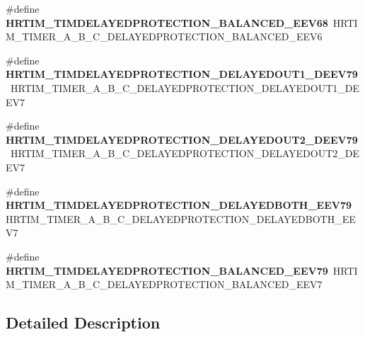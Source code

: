 \begin{DoxyCompactItemize}
\item 
\#define {\bfseries H\+R\+T\+I\+M\+\_\+\+T\+I\+M\+D\+E\+L\+A\+Y\+E\+D\+P\+R\+O\+T\+E\+C\+T\+I\+O\+N\+\_\+\+B\+A\+L\+A\+N\+C\+E\+D\+\_\+\+E\+E\+V68}~H\+R\+T\+I\+M\+\_\+\+T\+I\+M\+E\+R\+\_\+\+A\+\_\+\+B\+\_\+\+C\+\_\+\+D\+E\+L\+A\+Y\+E\+D\+P\+R\+O\+T\+E\+C\+T\+I\+O\+N\+\_\+\+B\+A\+L\+A\+N\+C\+E\+D\+\_\+\+E\+E\+V6\hypertarget{group___h_a_l___h_r_t_i_m___aliased___macros_gacc9d18290b90bd3ba98bc6aade450b32}{}\label{group___h_a_l___h_r_t_i_m___aliased___macros_gacc9d18290b90bd3ba98bc6aade450b32}

\item 
\#define {\bfseries H\+R\+T\+I\+M\+\_\+\+T\+I\+M\+D\+E\+L\+A\+Y\+E\+D\+P\+R\+O\+T\+E\+C\+T\+I\+O\+N\+\_\+\+D\+E\+L\+A\+Y\+E\+D\+O\+U\+T1\+\_\+\+D\+E\+E\+V79}~H\+R\+T\+I\+M\+\_\+\+T\+I\+M\+E\+R\+\_\+\+A\+\_\+\+B\+\_\+\+C\+\_\+\+D\+E\+L\+A\+Y\+E\+D\+P\+R\+O\+T\+E\+C\+T\+I\+O\+N\+\_\+\+D\+E\+L\+A\+Y\+E\+D\+O\+U\+T1\+\_\+\+D\+E\+E\+V7\hypertarget{group___h_a_l___h_r_t_i_m___aliased___macros_gaf2fa730ef2ff94596dc103780c6ea28a}{}\label{group___h_a_l___h_r_t_i_m___aliased___macros_gaf2fa730ef2ff94596dc103780c6ea28a}

\item 
\#define {\bfseries H\+R\+T\+I\+M\+\_\+\+T\+I\+M\+D\+E\+L\+A\+Y\+E\+D\+P\+R\+O\+T\+E\+C\+T\+I\+O\+N\+\_\+\+D\+E\+L\+A\+Y\+E\+D\+O\+U\+T2\+\_\+\+D\+E\+E\+V79}~H\+R\+T\+I\+M\+\_\+\+T\+I\+M\+E\+R\+\_\+\+A\+\_\+\+B\+\_\+\+C\+\_\+\+D\+E\+L\+A\+Y\+E\+D\+P\+R\+O\+T\+E\+C\+T\+I\+O\+N\+\_\+\+D\+E\+L\+A\+Y\+E\+D\+O\+U\+T2\+\_\+\+D\+E\+E\+V7\hypertarget{group___h_a_l___h_r_t_i_m___aliased___macros_ga8facb4c8782a5539246df190451ebf91}{}\label{group___h_a_l___h_r_t_i_m___aliased___macros_ga8facb4c8782a5539246df190451ebf91}

\item 
\#define {\bfseries H\+R\+T\+I\+M\+\_\+\+T\+I\+M\+D\+E\+L\+A\+Y\+E\+D\+P\+R\+O\+T\+E\+C\+T\+I\+O\+N\+\_\+\+D\+E\+L\+A\+Y\+E\+D\+B\+O\+T\+H\+\_\+\+E\+E\+V79}~H\+R\+T\+I\+M\+\_\+\+T\+I\+M\+E\+R\+\_\+\+A\+\_\+\+B\+\_\+\+C\+\_\+\+D\+E\+L\+A\+Y\+E\+D\+P\+R\+O\+T\+E\+C\+T\+I\+O\+N\+\_\+\+D\+E\+L\+A\+Y\+E\+D\+B\+O\+T\+H\+\_\+\+E\+E\+V7\hypertarget{group___h_a_l___h_r_t_i_m___aliased___macros_ga81abc6daa4a2456ca1428c3fe1796e52}{}\label{group___h_a_l___h_r_t_i_m___aliased___macros_ga81abc6daa4a2456ca1428c3fe1796e52}

\item 
\#define {\bfseries H\+R\+T\+I\+M\+\_\+\+T\+I\+M\+D\+E\+L\+A\+Y\+E\+D\+P\+R\+O\+T\+E\+C\+T\+I\+O\+N\+\_\+\+B\+A\+L\+A\+N\+C\+E\+D\+\_\+\+E\+E\+V79}~H\+R\+T\+I\+M\+\_\+\+T\+I\+M\+E\+R\+\_\+\+A\+\_\+\+B\+\_\+\+C\+\_\+\+D\+E\+L\+A\+Y\+E\+D\+P\+R\+O\+T\+E\+C\+T\+I\+O\+N\+\_\+\+B\+A\+L\+A\+N\+C\+E\+D\+\_\+\+E\+E\+V7\hypertarget{group___h_a_l___h_r_t_i_m___aliased___macros_gad90cefe9f64cf5f3efe38213706b4f94}{}\label{group___h_a_l___h_r_t_i_m___aliased___macros_gad90cefe9f64cf5f3efe38213706b4f94}

\end{DoxyCompactItemize}


\subsection{Detailed Description}
